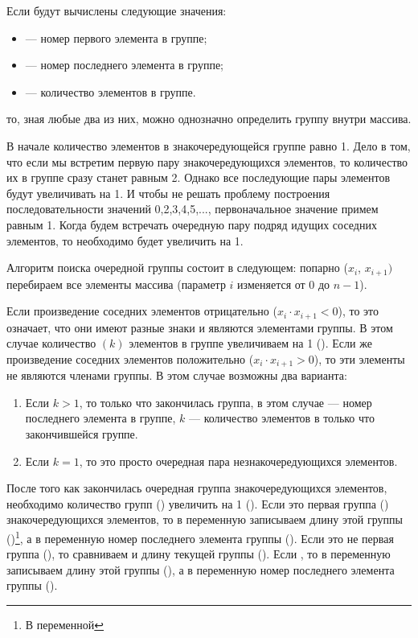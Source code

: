 
Если будут вычислены следующие значения:
\begin{itemize}
\item {} --- номер первого элемента в группе;
\item {} --- номер последнего элемента в группе;
\item {} --- количество элементов в группе.
\end{itemize}
то, зная любые два из них, можно однозначно определить группу внутри массива.

В начале количество элементов в знакочередующейся группе равно 1. Дело в том, что если мы встретим первую пару
знакочередующихся элементов, то количество их в группе сразу станет равным 2. Однако все последующие пары элементов
будут увеличивать  на 1. И чтобы не решать проблему построения последовательности значений
 0,2,3,4,5,..., первоначальное значение  примем равным 1. Когда будем встречать
очередную пару подряд идущих соседних элементов, то  необходимо будет увеличить на 1.

Алгоритм поиска очередной группы состоит в следующем: попарно ($x_i$, $x_{i+1})$ перебираем все элементы массива
(параметр $i$ изменяется от 0 до $n-1$). 

Если произведение соседних элементов отрицательно ($x_i\cdot x_{i+1} < 0$), то это означает, что они имеют разные знаки и
являются элементами группы. В этом случае количество $(k)$ элементов в группе увеличиваем на 1 ().
Если же произведение соседних элементов положительно ($x_i\cdot x_{i+1} > 0$), то эти элементы не являются членами
группы. В этом случае возможны два варианта:

\begin{enumerate}
\item Если  $k>1$, то только что закончилась группа, в этом случае  --- номер последнего элемента
в группе, $k$ --- количество элементов в только что закончившейся группе.
\item Если  $k=1$, то это просто очередная пара незнакочередующихся элементов.
\end{enumerate}
После того как закончилась очередная группа знакочередующихся элементов, необходимо количество групп
() увеличить на 1 (). Если это первая группа ()
знакочередующихся элементов, то в переменную  записываем длину этой группы
()\footnote{В переменной}, а в переменную
 номер последнего элемента группы
(). Если это не первая группа
(), то сравниваем  и длину текущей группы
(). Если , то в переменную 
записываем длину этой группы (), а в переменную
 номер последнего элемента группы
(). 

